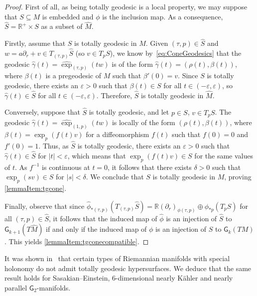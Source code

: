 \documentclass[11pt,a4paper,final]{amsart}
\newcommand{\s}{\mathsf}
\newcommand{\R}{\mathbb{R}}
\renewcommand{\hat}{\widehat}
\theoremstyle{definition}
\begin{document}
\begin{proof}
	First of all, as being totally geodesic is a local property, we may suppose that $S\subseteq M$ is embedded and $\phi$ is the inclusion map.
	As a consequence, $\hat{S}=\R^{+}\times S$ as a subset of $\hat{M}$.
	
	Firstly, assume that $S$ is totally geodesic in $M$.
	Given $(\tau,p)\in\hat{S}$ and $w=a \partial_{r}+v \in T_{(\tau,p)}\hat{S}$ (so $v\in T_{p}S$), we know by~\eqref{eq:ConeGeodesics} that the geodesic $\hat{\gamma}(t)=\hat{\exp}_{(\tau,p)}(tw)$ is of the form $\hat{\gamma}(t)=(\rho(t),\beta(t))$, where $\beta(t)$ is a pregeodesic of $M$ such that $\beta'(0)=v$.
	Since $S$ is totally geodesic, there exists an $\varepsilon>0$ such that $\beta(t)\in S$ for all $t\in(-\varepsilon,\varepsilon)$, so $\hat{\gamma}(t)\in \hat{S}$ for all $t\in(-\varepsilon,\varepsilon)$.
	Therefore, $\hat{S}$ is totally geodesic in $\hat{M}$.
	
	Conversely, suppose that $\hat{S}$ is totally geodesic, and let $p\in S$, $v\in T_{p}S$.
	The geodesic $\hat{\gamma}(t)=\hat{\exp}_{(1,p)}(tw)$ is locally of the form $(\rho(t),\beta(t))$, where $\beta(t)=\exp_{p}(f(t)v)$ for a diffeomorphism $f(t)$ such that $f(0)=0$ and $f'(0)=1$.
	Thus, as $\hat{S}$ is totally geodesic, there exists an $\varepsilon>0$ such that $\hat{\gamma}(t)\in\hat{S}$ for $\lvert t \rvert < \varepsilon$,  which means that $\exp_{p}(f(t)v)\in S$ for the same values of $t$.
	As $f^{-1}$ is continuous at $t=0$, it follows that there exists $\delta > 0$ such that $\exp_{p}(sv)\in S$ for $\lvert s \rvert <\delta$.
	We conclude that $S$ is totally geodesic in $M$, proving  \eqref{lemmaItem:tgcone}.
	
	Finally, observe that since $\hat{\phi}_{*(\tau,p)}(T_{(\tau,p)}\hat{S})=\R (\partial_{r})_{\phi(\tau,p)}\oplus \phi_{*p}(T_{p}S)$ for all $(\tau,p)\in\hat{S}$, it follows that the induced map of $\hat{\phi}$ is an injection of $\hat{S}$ to $\s{G}_{k+1}(T\hat{M})$ if and only if the induced map of $\phi$ is an injection of $S$ to $\s{G}_k(TM)$. This yields \eqref{lemmaItem:tgconecompatible}.
\end{proof}

It was shown in~\cite{JentschMoroianuSemmelmann} that certain types of Riemannian manifolds with special holonomy do not admit totally geodesic hypersurfaces.
We deduce that the same result holds for Sasakian--Einstein, $6$-dimensional nearly Kähler and nearly parallel $\s{G}_{2}$-manifolds.
\end{document}
